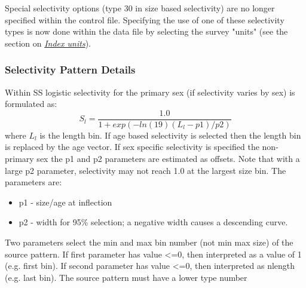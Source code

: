 Special selectivity options (type 30 in size based selectivity) are no longer specified within the control file. Specifying the use of one of these selectivity types is now done within the data file by selecting the survey "units" (see the section on \hyperlink{IndexUnits}{\textit{Index units}}).	

\subsubsection{Selectivity Pattern Details}
Within SS logistic selectivity for the primary sex (if selectivity varies by sex) is formulated as:
	\begin{equation}
	S_l = \frac{1.0}{1+exp(-ln(19)(L_l - p1)/p2)}
	\end{equation}
where $L_l$ is the length bin.  If age based selectivity is selected then the length bin is replaced by the age vector. If sex specific selectivity is specified the non-primary sex the p1 and p2 parameters are estimated as offsets.  Note that with a large p2 parameter, selectivity may not reach 1.0 at the largest size bin. The parameters are:
\begin{itemize}
	\item p1 - size/age at inflection
	\item p2 - width for 95\% selection; a negative width causes a descending curve.
\end{itemize}


Two parameters select the min and max bin number (not min max size) of the source pattern.  If first parameter has value <=0, then interpreted as a value of 1 (e.g. first bin).  If second parameter has value <=0, then interpreted as nlength (e.g. last bin). The source pattern must have a lower type number


